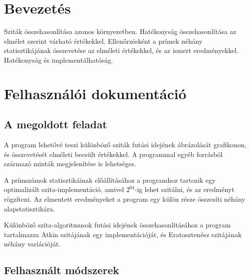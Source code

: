 \documentclass[12pt]{report}
\begin{document}
\tableofcontents

\chapter{Bevezetés}

Sziták összehasonlítása azonos környezetben.
Hatékonyság összehasonlítása az elmélet szerint várható értékekkel.
Ellenőrzésként a prímek néhány statisztikájának összevetése az elméleti értékekkel,
és az ismert eredményekkel.
Hatékonyság és implementálhatóság.

\chapter{Felhasználói dokumentáció}

\section{A megoldott feladat}

A program lehetővé teszi különböző sziták futási idejének ábrázolását grafikonon,
és összevetését elméleti becsült értékekkel.
A programmal egyéb forrásból származó minták megjelenítése is lehetséges.

A prímszámok statisztikáinak előállításához a programhoz tartozik egy optimalizált
szita-implementáció, amivel $2^{64}$-ig lehet szitálni, és az eredményt rögzíteni.
Az elmentett eredményeket a program egy külön része összesíti néhány alapstatisztikára.  %

Különböző szita-algoritmusok futási idejének összehasonlításához a program tartalmazza
Atkin szitájának egy implementációját, és Eratosztenész szitájának néhány variációját.

\section{Felhasznált módszerek}
\end{document}
